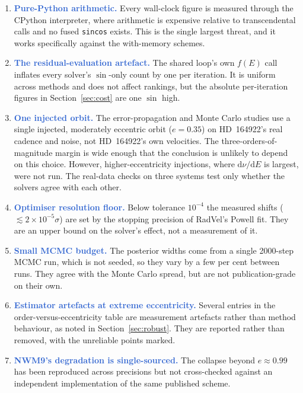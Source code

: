 \documentclass[11pt,a4paper]{article}
\newcommand{\key}[1]{\textcolor{Highlight}{\bfseries #1}}
\begin{document}
\begin{enumerate}
  \item \key{Pure-Python arithmetic.} Every wall-clock figure is measured
        through the CPython interpreter, where arithmetic is expensive
        relative to transcendental calls and no fused \texttt{sincos}
        exists. This is the single largest threat, and it works
        specifically against the with-memory schemes.
  \item \key{The residual-evaluation artefact.} The shared loop's own
        $f(E)$ call inflates every solver's $\sin$-only count by one per
        iteration. It is uniform across methods and does not affect
        rankings, but the absolute per-iteration figures in
        Section~\ref{sec:cost} are one $\sin$ high.
  \item \key{One injected orbit.} The error-propagation and Monte Carlo
        studies use a single injected, moderately eccentric orbit
        ($e = 0.35$) on HD~164922's real cadence and noise, not HD~164922's
        own velocities. The three-orders-of-magnitude margin is wide enough
        that the conclusion is unlikely to depend on this choice. However,
        higher-eccentricity injections, where $\mathrm{d}\nu/\mathrm{d}E$
        is largest, were not run. The real-data checks on three systems
        test only whether the solvers agree with each other.
  \item \key{Optimiser resolution floor.} Below tolerance $10^{-4}$ the
        measured shifts ($\lesssim 2\times10^{-5}\sigma$) are set by the
        stopping precision of RadVel's Powell fit. They are an upper bound
        on the solver's effect, not a measurement of it.
  \item \key{Small MCMC budget.} The posterior widths come from a single
        2000-step MCMC run, which is not seeded, so they vary by a few per
        cent between runs. They agree with the Monte Carlo spread,
        but are not publication-grade on their own.
  \item \key{Estimator artefacts at extreme eccentricity.} Several entries
        in the order-versus-eccentricity table are measurement artefacts
        rather than method behaviour, as noted in
        Section~\ref{sec:robust}. They are reported rather than removed,
        with the unreliable points marked.
  \item \key{NWM9's degradation is single-sourced.} The collapse beyond
        $e \approx 0.99$ has been reproduced across precisions but not
        cross-checked against an independent implementation of the same
        published scheme.
\end{enumerate}
\end{document}
